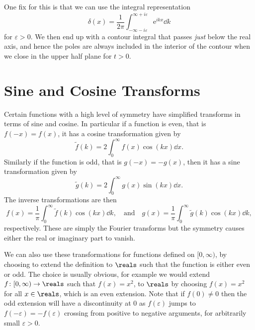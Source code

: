 \documentclass[fleqn]{NotesClass}
\newcommand*{\e}{\mathrm{e}}
\begin{document}
    One fix for this is that we can use the integral representation
    \begin{equation}
        \delta(x) = \frac{1}{2\pi} \int_{-\infty - i\varepsilon}^{\infty + i\varepsilon} \e^{ikx} \dd{k}
    \end{equation}
    for \(\varepsilon > 0\).
    We then end up with a contour integral that passes \emph{just} below the real axis, and hence the poles are always included in the interior of the contour when we close in the upper half plane for \(t > 0\).
    
    \section{Sine and Cosine Transforms}
    Certain functions with a high level of symmetry have simplified transforms in terms of sine and cosine.
    In particular if a function is even, that is \(f(-x) = f(x)\), it has a cosine transformation given by
    \begin{equation}
        \tilde{f}(k) = 2\int_{0}^{\infty} f(x)\cos(kx) \dd{x}.
    \end{equation}
    Similarly if the function is odd, that is \(g(-x) = -g(x)\), then it  has a sine transformation given by
    \begin{equation}
        \tilde{g}(k) = 2\int_{0}^{\infty} g(x) \sin(kx) \dd{x}.
    \end{equation}
    The inverse transformations are then
    \begin{equation}
        f(x) = \frac{1}{\pi} \int_{0}^{\infty} \tilde{f}(k) \cos(kx) \dd{k}, \quad\text{and}\quad g(x) = \frac{1}{\pi} \int_{0}^{\infty}  \tilde{g}(k) \cos(kx) \dd{k},
    \end{equation}
    respectively.
    These are simply the Fourier transforms but the symmetry causes either the real or imaginary part to vanish.
    
    We can also use these transformations for functions defined on \([0, \infty)\), by choosing to extend the definition to \(\reals\) such that the function is either even or odd.
    The choice is usually obvious, for example we would extend \(f \colon [0, \infty) \to \reals\) such that \(f(x) = x^2\), to \(\reals\) by choosing \(f(x) = x^2\) for all \(x \in \reals\), which is an even extension.
    Note that if \(f(0) \ne 0\) then the odd extension will have a discontinuity at \(0\) as \(f(\varepsilon)\) jumps to \(f(-\varepsilon) = -f(\varepsilon)\) crossing from positive to negative arguments, for arbitrarily small \(\varepsilon > 0\).
    
\end{document}
